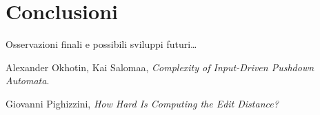 \documentclass[a4paper,12pt]{report}
\theoremstyle{propositionstyle}
\begin{document}
    \chapter{Conclusioni}

    Osservazioni finali e possibili sviluppi futuri\ldots

    \clearpage
    \begin{thebibliography}{9}

        Alexander Okhotin, Kai Salomaa,
        \textit{Complexity of Input-Driven Pushdown Automata}.

        Giovanni Pighizzini,
        \textit{How Hard Is Computing the Edit Distance?}


    \end{thebibliography}
\end{document}
